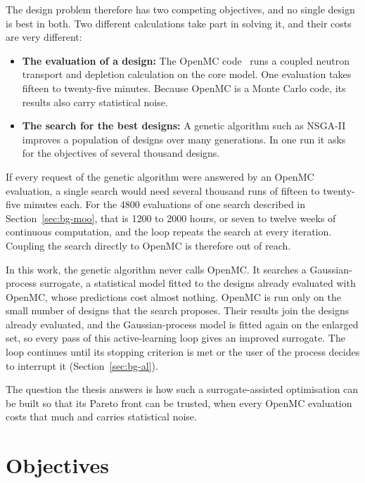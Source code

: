 The design problem therefore has two competing objectives, and no
single design is best in both. Two different calculations take part in
solving it, and their costs
are very different:

\begin{itemize}
  \item \textbf{The evaluation of a design:} The OpenMC
        code~\cite{romano_openmc_2015} runs a coupled neutron transport
        and depletion calculation on the core model. One evaluation
        takes fifteen to twenty-five minutes. Because OpenMC is a Monte
        Carlo code, its results also carry statistical noise.

  \item \textbf{The search for the best designs:} A genetic algorithm
        such as NSGA-II improves a population of designs over many
        generations. In one run it asks for the objectives of several
        thousand designs.
\end{itemize}

If every request of the genetic algorithm were answered by an OpenMC
evaluation, a single search would need several thousand runs of fifteen
to twenty-five minutes each. For the 4800 evaluations of one search
described in Section~\ref{sec:bg-moo}, that is 1200 to 2000 hours, or
seven to twelve weeks of continuous computation, and the loop repeats
the search at every iteration. Coupling the search directly to OpenMC is
therefore out of reach.

In this work, the genetic algorithm never calls OpenMC. It searches a
Gaussian-process surrogate, a statistical model fitted to the designs
already evaluated with OpenMC, whose predictions cost almost nothing.
OpenMC is run only on the small number of designs that the search
proposes. Their results join the designs already evaluated, and the
Gaussian-process model is fitted again on the enlarged set, so every
pass of this active-learning loop gives an improved surrogate. The loop
continues until its stopping criterion is met or the user of the
process decides to interrupt it (Section~\ref{sec:bg-al}).

The question the thesis answers is how such a surrogate-assisted
optimisation can be built so that its Pareto front can be trusted, when
every OpenMC evaluation costs that much and carries statistical noise.

\section{Objectives}
\label{sec:intro-objectives}

